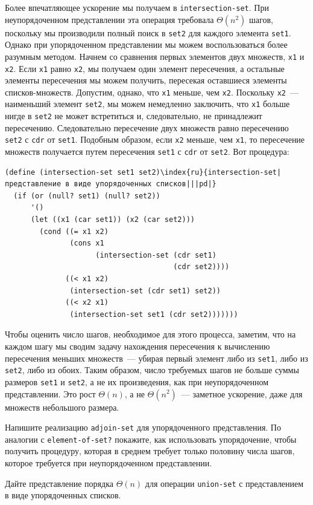 Более впечатляющее ускорение мы получаем в
{\tt intersection-set}.  При неупорядоченном представлении эта
операция требовала $\Theta (n^2)$ шагов, поскольку мы
производили полный поиск  в {\tt set2} для каждого элемента
{\tt set1}.  Однако при упорядоченном представлении мы можем
воспользоваться более разумным методом.  Начнем со сравнения первых
элементов двух множеств, {\tt x1} и {\tt x2}.  Если
{\tt x1} равно {\tt x2}, мы получаем один элемент
пересечения, а остальные элементы пересечения мы можем получить,
пересекая оставшиеся элементы списков-множеств.  Допустим, однако, что 
{\tt x1} меньше, чем {\tt x2}.  Поскольку
{\tt x2}~--- наименьший элемент {\tt set2}, мы можем
немедленно заключить, что {\tt x1} больше нигде в
{\tt set2} не может встретиться и, следовательно, не
принадлежит пересечению.  Следовательно пересечение двух множеств
равно пересечению {\tt set2} с {\tt cdr} от
{\tt set1}.  Подобным образом, если {\tt x2} меньше, чем
{\tt x1}, то пересечение множеств получается путем пересечения
{\tt set1} с {\tt cdr} от {\tt set2}.  Вот
процедура: 

\begin{Verbatim}[fontsize=\small]
(define (intersection-set set1 set2)\index{ru}{intersection-set|представление в виде упорядоченных списков|||pd|}
  (if (or (null? set1) (null? set2))
      '()
      (let ((x1 (car set1)) (x2 (car set2)))
        (cond ((= x1 x2)
               (cons x1
                     (intersection-set (cdr set1)
                                       (cdr set2))))
              ((< x1 x2)
               (intersection-set (cdr set1) set2))
              ((< x2 x1)
               (intersection-set set1 (cdr set2)))))))
\end{Verbatim}
Чтобы оценить число шагов, необходимое для этого процесса, заметим, 
что на каждом шагу мы сводим задачу нахождения пересечения к вычислению
пересечения меньших множеств~--- убирая первый элемент либо из
{\tt set1}, либо из {\tt set2}, либо из обоих.  Таким
образом, число требуемых шагов не больше суммы размеров
{\tt set1} и {\tt set2}, а не их произведения, как при
неупорядоченном представлении.  Это рост $\Theta (n)$, а не 
$\Theta (n^2)$~--- заметное ускорение, даже для множеств
небольшого размера.
\begin{exercise}{2.61}\label{EX2.61}%
Напишите реализацию {\tt adjoin-set} для
упорядоченного представления. По аналогии с
{\tt element-of-set?} покажите, как использовать упорядочение,
чтобы получить процедуру, которая в среднем требует только половину
 числа шагов, которое требуется при неупорядоченном
представлении.
\end{exercise}
\begin{exercise}{2.62}\label{EX2.62}%
Дайте представление порядка $\Theta (n)$ для
операции 
{\tt union-set} с представлением в виде упорядоченных
списков.
\end{exercise}

